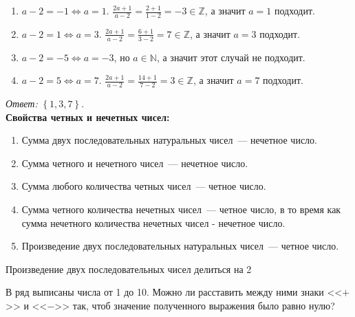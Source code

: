 \documentclass[11pt]{article}
\begin{document}
\begin{enumerate}
	\item $a - 2 = -1 \Leftrightarrow a = 1$. $\frac{2 a + 1}{a - 2} = \frac{2 + 1}{1 - 2} = -3 \in \mathbb{Z}$, а значит $a = 1$ подходит.

	\item $a - 2 = 1 \Leftrightarrow a = 3$. $\frac{2 a + 1}{a - 2} = \frac{6 + 1}{3 - 2} = 7 \in \mathbb{Z}$, а значит $a = 3$ подходит.

	\item $a - 2 = -5 \Leftrightarrow a = -3$, но $a \in \mathbb{N}$, а значит этот случай не подходит.

	\item $a - 2 = 5 \Leftrightarrow a = 7$. $\frac{2 a + 1}{a - 2} = \frac{14 + 1}{7 - 2} = 3 \in \mathbb{Z}$, а значит $a = 7$ подходит.
\end{enumerate}

\textit{Ответ:} $\left\{ 1, 3, 7\right\}$.\\


\textbf{Свойства четных и нечетных чисел:}

\begin{enumerate}
	\item Сумма двух последовательных натуральных чисел~--- нечетное число.

	\item Сумма четного и нечетного чисел~--- нечетное число.

	\item Сумма любого количества четных чисел~--- четное число.

	\item Сумма четного количества нечетных чисел~--- четное число, в то время как сумма нечетного количества нечетных чисел - нечетное число.

	\item Произведение двух последовательных натуральных чисел~--- четное число.

\end{enumerate}

\begin{theorem}

	 Произведение двух последовательных чисел делиться на 2\\

\end{theorem}


\begin{example}

	В ряд выписаны числа от 1 до 10. Можно ли расставить между ними знаки <<$+$>> и <<$-$>> так, чтоб значение полученного выражения было равно нулю?

\end{example}
\end{document}

